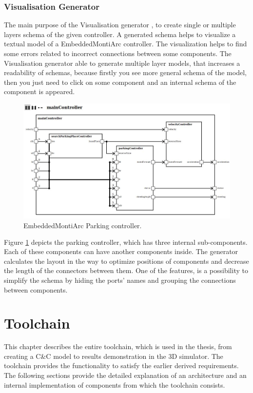 \subsection{Visualisation Generator} \label{sec:svggen}
The main purpose of the Visualisation generator \cite{VisMA18}, to create single or multiple layers schema of the given controller. A generated schema helps to visualize a textual model of a EmbeddedMontiArc controller. The visualization helps to find some errors related to incorrect connections between some components. The Visualisation generator able to generate multiple layer models, that increases a readability of schemas, because firstly you see more general schema of the model, then you just need to click on some component and an internal schema of the component is appeared.
\begin{figure}[h!]
    \centering
    \includegraphics[width=\linewidth]{src/pic/controller03}
    \caption{EmbeddedMontiArc Parking controller.}
    \label{fig:parkingCtrl}
\end{figure}
Figure \ref{fig:parkingCtrl} depicts the parking controller, which has three internal sub-components. Each of these components can have another components inside. The generator calculates the layout in the way to optimize positions of components and decrease the length of the connectors between them. One of the features, is a possibility to simplify the schema by hiding the ports' names and grouping the connections between components.

\chapter{Toolchain} \label{sec:toolchain}
This chapter describes the entire toolchain, which is used in the thesis, from creating a C\&C model to results demonstration in the 3D simulator. The toolchain provides the functionality to satisfy the earlier derived requirements. The following sections provide the detailed explanation of an architecture and an internal implementation of components from which the toolchain consists.

